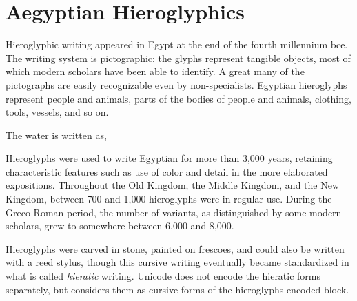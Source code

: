 \newfontfamily{}
\def\texthiero#1{{\color{black!95}\hiero #1}}
\ExplSyntaxOn
\NewDocumentCommand{}

\NewDocumentCommand{}


\ExplSyntaxOff


\chapter{Aegyptian Hieroglyphics}
\label{ch:hieroglyphics}


\newfontfamily{}

Hieroglyphic writing appeared in Egypt at the end of the fourth millennium bce. The writing
system is pictographic: the glyphs represent tangible objects, most of which modern
scholars have been able to identify. A great many of the pictographs are easily recognizable
even by non-specialists. Egyptian hieroglyphs represent people and animals, parts of the
bodies of people and animals, clothing, tools, vessels, and so on.

\basket

The water is written as,

\water[test]  

Hieroglyphs were used to write Egyptian for more than 3,000 years, retaining characteristic
features such as use of color and detail in the more elaborated expositions. Throughout the
Old Kingdom, the Middle Kingdom, and the New Kingdom, between 700 and 1,000 hieroglyphs
were in regular use. During the Greco-Roman period, the number of variants, as
distinguished by some modern scholars, grew to somewhere between 6,000 and 8,000.

Hieroglyphs were carved in stone, painted on frescoes, and could also be written with a reed
stylus, though this cursive writing eventually became standardized in what is called \emph{hieratic}
writing. Unicode does not encode the hieratic forms separately, but considers them as cursive forms of the hieroglyphs encoded block.

